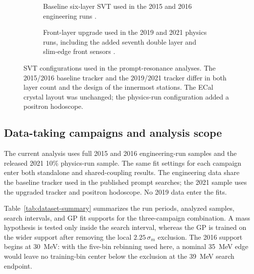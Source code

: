 \begin{figure}[H]
\centering
\begin{subfigure}[t]{0.90\linewidth}
  \centering
  \caption{Baseline six-layer SVT used in the 2015 and 2016 engineering runs
  \cite{HPS2016BumpInternal}.}
\end{subfigure}

\vspace{0.9em}

\begin{subfigure}[t]{0.78\linewidth}
  \centering
  \caption{Front-layer upgrade used in the 2019 and 2021 physics runs, including the
  added seventh double layer and slim-edge front sensors
  \cite{HPSExperiment2022,HPSSlimEdgeSensors2020}.}
\end{subfigure}
\caption{SVT configurations used in the prompt-resonance analyses. The 2015/2016
baseline tracker and the 2019/2021 tracker differ in both layer count and the design
of the innermost stations. The ECal crystal layout was unchanged; the physics-run
configuration added a positron hodoscope.}
\label{fig:hps-svt-eras}
\end{figure}

\subsection{Data-taking campaigns and analysis scope}

The current analysis uses full 2015 and 2016 engineering-run samples and the
released 2021 10\% physics-run sample. The same fit settings for each campaign
enter both standalone and shared-coupling results. The engineering data share
the baseline tracker used in the published prompt searches; the 2021 sample
uses the upgraded tracker and positron hodoscope. No 2019 data enter the fits.

Table~\ref{tab:dataset-summary} summarizes the run periods, analyzed samples, search
intervals, and GP fit supports for the three-campaign combination. A mass hypothesis is
tested only inside the search interval, whereas the GP is trained on the wider support
after removing the local $2.25\,\sigma_m$ exclusion. The 2016 support begins at
\SI{30}{MeV}: with the five-bin rebinning used here, a nominal \SI{35}{MeV} edge would
leave no training-bin center below the exclusion at the \SI{39}{MeV} search endpoint.


